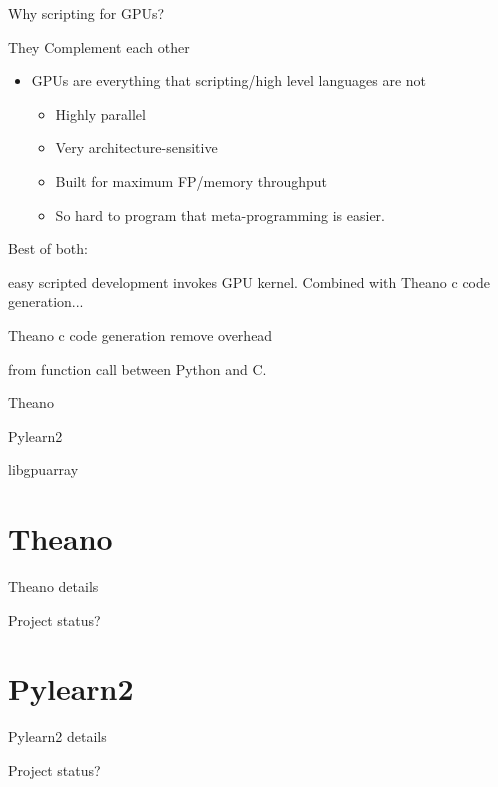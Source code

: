 \documentclass[utf8x,xcolor=pdftex,dvipsnames,table]{beamer}
\begin{document}
\begin{frame}{Why scripting for GPUs?}
\begin{bf}They Complement each other\end{bf}
\begin{itemize}

  \item GPUs are everything that scripting/high level languages are not

    \begin{itemize}
    \item Highly parallel
    \item Very architecture-sensitive
    \item Built for maximum FP/memory throughput
    \item So hard to program that meta-programming is easier.
    \end{itemize}
\end{itemize}

\begin{bf}Best of both:\end{bf} easy scripted development invokes GPU kernel.
Combined with Theano c code generation...
\begin{bf}Theano c code generation remove overhead\end{bf} from function call between Python and C.

\end{frame}

\begin{frame}{Theano}
\end{frame}
\begin{frame}{Pylearn2}
\end{frame}
\begin{frame}{libgpuarray}
\end{frame}


\section{Theano}
\begin{frame}{Theano details}
\end{frame}
\begin{frame}{Project status?}
\end{frame}


\section{Pylearn2}
\begin{frame}{Pylearn2 details}
\end{frame}
\begin{frame}{Project status?}
\end{frame}
\end{document}
